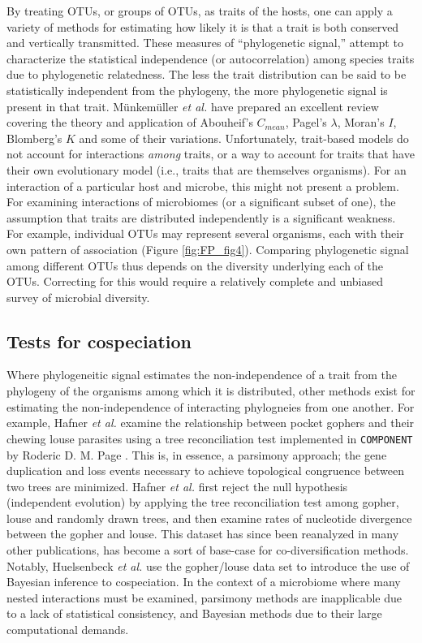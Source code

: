 By treating OTUs, or groups of OTUs, as traits of the hosts, one can apply a variety of methods for estimating how likely it is that a trait is both conserved and vertically transmitted. These measures of ``phylogenetic signal,'' attempt to characterize the statistical independence (or autocorrelation) among species traits due to phylogenetic relatedness. The less the trait distribution can be said to be statistically independent from the phylogeny, the more phylogenetic signal is present in that trait. \cite{felsenstein1985phylogenies} M{\"u}nkem{\"u}ller {\em et al.} \cite{munkemuller2012measure} have prepared an excellent review covering the theory and application of Abouheif's $C_{mean}$, Pagel's $\lambda$, Moran's $I$, Blomberg's $K$ and some of their variations. Unfortunately, trait-based models do not account for interactions {\em among} traits, or a way to account for traits that have their own evolutionary model (i.e., traits that are themselves organisms). For an interaction of a particular host and microbe, this might not present a problem. For examining interactions of microbiomes (or a significant subset of one), the assumption that traits are distributed independently is a significant weakness. For example, individual OTUs may represent several organisms, each with their own pattern of association (Figure \ref{fig:FP_fig4}). Comparing phylogenetic signal among different OTUs thus depends on the diversity underlying each of the OTUs. Correcting for this would require a relatively complete and unbiased survey of microbial diversity.



\subsection{Tests for cospeciation}

Where phylogeneitic signal estimates the non-independence of a trait from the phylogeny of the organisms among which it is distributed, other methods exist for estimating the non-independence of interacting phylogneies from one another. For example, Hafner {\em et al.} \cite{hafner1994disparate} examine the relationship between pocket gophers and their chewing louse parasites using a tree reconciliation test implemented in {\tt COMPONENT} by Roderic D. M. Page \cite{page1993genes}. This is, in essence, a parsimony approach; the gene duplication and loss events necessary to achieve topological congruence between two trees are minimized. Hafner {\em et al.} first reject the null hypothesis (independent evolution) by applying the tree reconciliation test among gopher, louse and randomly drawn trees, and then examine rates of nucleotide divergence between the gopher and louse. This dataset has since been reanalyzed in many other publications, has become a sort of base-case for co-diversification methods. Notably, Huelsenbeck {\em et al.} use the gopher/louse data set to introduce the use of Bayesian inference to cospeciation. \cite{huelsenbeck2000bayesian} In the context of a microbiome where many nested interactions must be examined, parsimony methods are inapplicable due to a lack of statistical consistency, \cite{felsenstein1978cases} and Bayesian methods due to their large computational demands.

